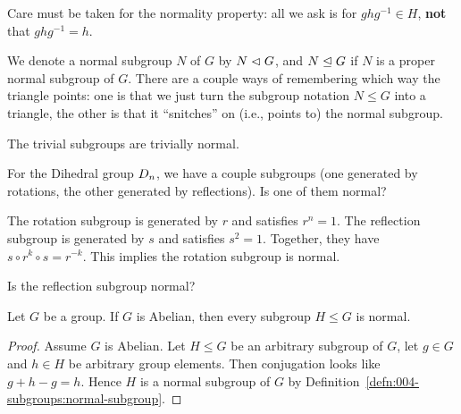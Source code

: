\begin{remark}
Care must be taken for the normality property: all we ask is for
$ghg^{-1}\in H$, \textbf{not} that $ghg^{-1}=h$. 
\end{remark}

\begin{remark}[Notation]
  We denote a normal subgroup $N$ of $G$ by $N \mathrel{\lhd} G$, and
  $N \trianglelefteq G$ if $N$ is a proper normal subgroup of
  $G$. There are a couple ways of remembering which way the triangle
  points: one is that we just turn the subgroup notation $N\leq G$ into
  a triangle, the other is that it ``snitches'' on (i.e., points to) the
  normal subgroup.
\end{remark}

\begin{example}
The trivial subgroups are trivially normal.
\end{example}

\begin{example}
For the Dihedral group $D_{n}$, we have a couple subgroups (one
generated by rotations, the other generated by reflections). Is one of
them normal?

The rotation subgroup is generated by $r$ and satisfies $r^{n}=1$. The
reflection subgroup is generated by $s$ and satisfies
$s^{2}=1$. Together, they have $s\circ r^{k}\circ s=r^{-k}$. This
implies the rotation subgroup is normal.

Is the reflection subgroup normal?
\end{example}

\begin{theorem}\label{thm:004-subgroups:abelian-implies-subgroups-are-normal}
  Let $G$ be a group.
  If $G$ is Abelian, then every subgroup $H\leq G$ is normal.
\end{theorem}

\begin{proof}
Assume $G$ is Abelian. Let $H\leq G$ be an arbitrary subgroup of $G$,
let $g\in G$ and $h\in H$ be arbitrary group elements. Then conjugation
looks like $g+h-g=h$. Hence $H$ is a normal subgroup of $G$ by
Definition~\ref{defn:004-subgroups:normal-subgroup}.
\end{proof}


